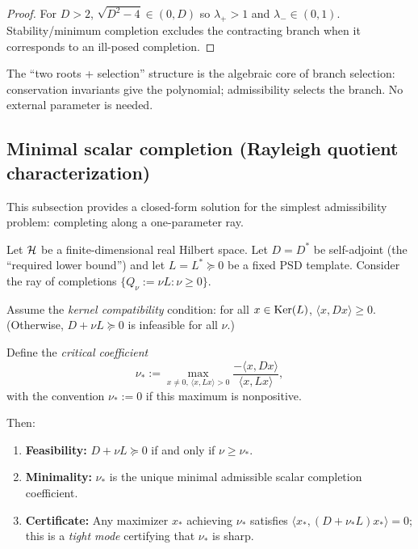 \begin{proof}
For $D>2$, $\sqrt{D^2-4}\in(0,D)$ so $\lambda_+ > 1$ and $\lambda_- \in (0,1)$.
Stability/minimum completion excludes the contracting branch when it corresponds to an ill-posed completion.
\end{proof}

\begin{remark}
The ``two roots + selection'' structure is the algebraic core of branch selection:
conservation invariants give the polynomial; admissibility selects the branch.
No external parameter is needed.
\end{remark}

\subsection{Minimal scalar completion (Rayleigh quotient characterization)}
\label{subsec:scalar-completion}

This subsection provides a closed-form solution for the simplest admissibility problem: completing along a one-parameter ray.

\begin{theorem}
\label{thm:scalar-completion}
Let $\mathcal{H}$ be a finite-dimensional real Hilbert space.
Let $D = D^*$ be self-adjoint (the ``required lower bound'') and let $L = L^* \succeq 0$ be a fixed PSD template.
Consider the ray of completions $\{Q_\nu := \nu L : \nu \ge 0\}$.

Assume the \emph{kernel compatibility} condition: for all $x \in \mathrm{Ker}(L)$, $\langle x, D x \rangle \ge 0$.
(Otherwise, $D + \nu L \succeq 0$ is infeasible for all $\nu$.)

Define the \emph{critical coefficient}
\[
\nu_* := \max_{x \ne 0,\, \langle x, Lx \rangle > 0} \frac{-\langle x, D x \rangle}{\langle x, L x \rangle},
\]
with the convention $\nu_* := 0$ if this maximum is nonpositive.

Then:
\begin{enumerate}[label=(\roman*)]
\item \textbf{Feasibility:} $D + \nu L \succeq 0$ if and only if $\nu \ge \nu_*$.
\item \textbf{Minimality:} $\nu_*$ is the unique minimal admissible scalar completion coefficient.
\item \textbf{Certificate:} Any maximizer $x_*$ achieving $\nu_*$ satisfies $\langle x_*, (D + \nu_* L) x_* \rangle = 0$; this is a \emph{tight mode} certifying that $\nu_*$ is sharp.
\end{enumerate}
\end{theorem}


